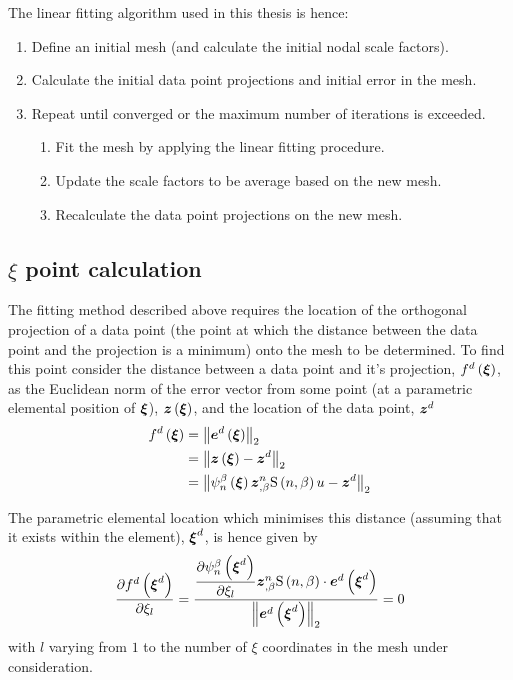 The linear fitting algorithm used in this thesis is hence:
\begin{enumerate}
\item Define an initial mesh (and calculate the initial nodal scale factors).
  \item Calculate the initial data point projections and initial error in the
    mesh.
  \item Repeat until converged or the maximum number of iterations is exceeded.
  \begin{enumerate}
  \item Fit the mesh by applying the linear fitting procedure.
  \item Update the scale factors to be average \arclens based on the new
    mesh.
  \item Recalculate the data point projections on the new mesh.
  \end{enumerate}
\end{enumerate}

\subsection{$\xi$ point calculation}
\label{sec:xipointcalculation}

The fitting method described above requires the location of the orthogonal
projection of a data point (the point at which the distance between the data
point and the projection is a minimum) onto the mesh to be determined. To find
this point consider the distance between a data point and it's projection,
$ f^{d}\left(  \boldsymbol{\xi}  \right) $, as the Euclidean norm of the error vector from some point (at a
parametric elemental position of $ \boldsymbol{\xi} $), $  \boldsymbol{z} \left(  \boldsymbol{\xi}  \right) $,
and the location of the data point, $ \boldsymbol{z} ^{d}$ \ie
\begin{equation}
  \begin{split}
    \fnof{f^{d}}{\vectr{\xi}}&=\norm{\fnof{\vectr{e}^{d}}{\vect{\xi}}} \\ 
    &=\norm{\fnof{\vect{z}}{\vect{\xi}}-\vect{z}^{d}} \\ 
    &=\norm{\gbfn{n}{\beta}{\vectr{\xi}}\vect{z}^{n}_{,\beta}
      \gsf{n}{\beta}{u}-\vect{z}^{d}}
  \end{split}
\end{equation}

The parametric elemental location which minimises this distance (assuming
that it exists within the element), $\vect{\xi}^{d}$, is hence given by
\begin{equation}
   \dfrac{\partial  f^{d}\left(  \boldsymbol{\xi} ^{d} \right) }{\partial \xi_{l}} =
  \dfrac{ \dfrac{\partial    \psi_{n}^{\beta} \left(  \boldsymbol{\xi} ^{d} \right)  }{\partial \xi_{l}} 
      \boldsymbol{z} ^{n}_{,\beta}   \mathrm{S} \left( n,\beta \right)    \cdot    \boldsymbol{e} ^{d}\left(  \boldsymbol{\xi} ^{d} \right)  }{
     {\left\|   \boldsymbol{e} ^{d}\left(  \boldsymbol{\xi} ^{d} \right)  \right\|_{2}} }=0
\end{equation}
with $l$ varying from $1$ to the number of $\xi$ coordinates in the mesh under
consideration.

